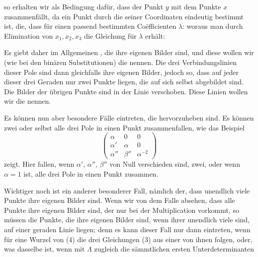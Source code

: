 so erhalten wir als Bedingung dafür, dass der Punkt $y$ mit dem Punkte $x$ zusammenfällt, da ein Punkt durch die  seiner Coordinaten eindeutig bestimmt ist, die, dass für einen passend bestimmten Co\"efficienten $\lambda$:
woraus man durch Elimination von $x_1, x_2, x_3$ die  Gleichung für $\lambda$ erhält:

Es giebt daher im Allgemeinen , die ihre eigenen Bilder sind, und diese wollen wir (wie bei den binären Substitutionen) die  nennen. Die drei Verbindungslinien dieser Pole sind dann gleichfalls ihre eigenen Bilder, jedoch so, dass auf jeder dieser drei Geraden nur zwei Punkte liegen, die auf sich selbst abgebildet sind. Die Bilder der übrigen Punkte sind in der Linie verschoben. Diese Linien wollen wir die  nennen.

Es können nun aber besondere Fälle eintreten, die hervorzuheben sind. Es können zwei oder selbst alle drei Pole in einen Punkt zusammenfallen, wie das Beispiel
\[ \begin{pmatrix} \alpha & 0 & 0 \\ \alpha' & \alpha & 0 \\ \alpha'' & \beta'' & \alpha^{-2} \end{pmatrix} \]
zeigt. Hier fallen, wenn $\alpha'$, $\alpha''$, $\beta''$ von Null verschieden sind, zwei, oder wenn $\alpha = 1$ ist, alle drei Pole in einen Punkt zusammen.

Wichtiger noch ist ein anderer besonderer Fall, nämlich der, dass unendlich viele Punkte ihre eigenen Bilder sind. Wenn wir von dem Falle absehen, dass alle Punkte ihre eigenen Bilder sind, der nur bei der Multiplication vorkommt, so müssen die Punkte, die ihre eigenen Bilder sind, wenn ihrer unendlich viele sind, auf einer geraden Linie liegen; denn es kann dieser Fall nur dann eintreten, wenn für eine Wurzel von (4) die drei Gleichungen (3) aus einer von ihnen folgen, oder, was dasselbe ist, wenn mit $\Lambda$ zugleich die sämmtlichen ersten Unterdeterminanten
